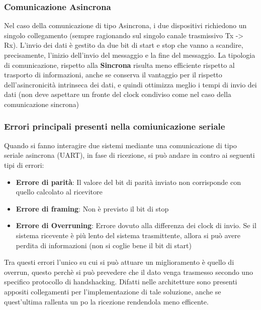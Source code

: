 \subsubsection{Comunicazione Asincrona}
Nel caso della comunicazione di tipo Asincrona, i due dispositivi richiedono un singolo collegamento (sempre ragionando sul singolo canale trasmissivo Tx -> Rx).
L'invio dei dati è gestito da due bit di start e stop che vanno a scandire, precisamente, l'inizio dell'invio del messaggio e la fine del messaggio.
La tipologia di comunicazione, rispetto alla \textbf{Sincrona} risulta meno efficiente rispetto al trasporto di informazioni, anche se conserva il vantaggio per il rispetto dell'asincronicità intrinseca dei dati, e quindi ottimizza meglio i tempi di invio dei dati (non deve aspettare un fronte del clock condiviso come nel caso della comunicazione sincrona)

\subsubsection{Errori principali presenti nella comiunicazione seriale}
Quando si fanno interagire due sistemi mediante una comunicazione di tipo seriale asincrona (UART), in fase di ricezione, si può andare in contro ai seguenti tipi di errori:
\begin{itemize}
    \item \textbf{Errore di parità}: Il valore del bit di parità inviato non corrisponde con quello calcolato al ricevitore
    \item \textbf{Errore di framing}: Non è previsto il bit di stop
    \item \textbf{Errore di Overruning}: Errore dovuto alla differenza dei clock di invio. Se il sistema ricevente è più lento del sistema trasmittente, allora si può avere perdita di informazioni (non si coglie bene il bit di start)
\end{itemize}

Tra questi errori l'unico su cui si può attuare un miglioramento è quello di overrun, questo perchè si può prevedere che il dato venga trasmesso secondo uno specifico protocollo di handshacking. Difatti nelle architetture sono presenti appositi collegamenti per l'implementazione di tale soluzione, anche se quest'ultima rallenta un po la ricezione rendendola meno efficente.
